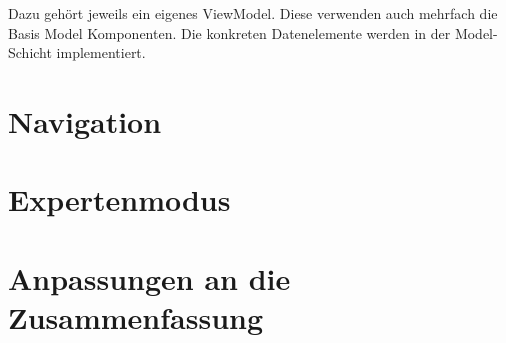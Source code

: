 Dazu gehört jeweils ein eigenes ViewModel.  Diese verwenden auch mehrfach die Basis Model Komponenten. Die konkreten Datenelemente werden in der Model-Schicht implementiert. 


\section{Navigation}
\section{Expertenmodus}
\section{Anpassungen an die Zusammenfassung}
